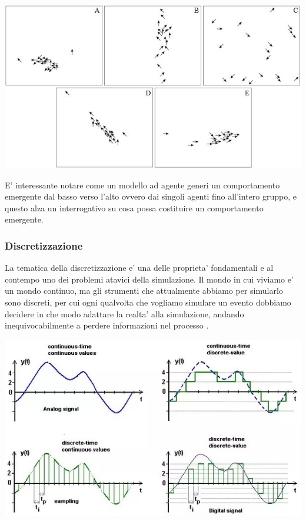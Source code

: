 \begin{minipage}{\linewidth}
    \centering
    \includegraphics{img/Figure6b.jpg}
    \label{fig:flock_emergent_behaviour}
\end{minipage}

E' interessante notare come un modello ad agente generi un comportamento emergente dal basso 
verso l'alto ovvero dai singoli agenti fino all'intero gruppo, e questo alza un interrogativo 
su cosa possa costituire un comportamento emergente. 

\subsubsection{Discretizzazione}
La tematica della discretizzazione e' una delle proprieta' fondamentali
e al contempo uno dei problemi atavici della simulazione.
Il mondo in cui viviamo e' un mondo continuo, ma gli strumenti
che attualmente abbiamo per simularlo sono discreti, per cui 
ogni qualvolta che vogliamo simulare un evento dobbiamo decidere 
in che modo adattare la realta' alla simulazione, andando 
inequivocabilmente a perdere informazioni nel processo 
\cite{KONSTANTINOUDIS2020100319}. 

\begin{minipage}{\linewidth}
    \centering
    \includegraphics[scale=0.5]{img/main-qimg-100fc99cfe855462247225a07e1dfb7e-pjlq.jpg}
    \label{fig:discretization}
\end{minipage}

